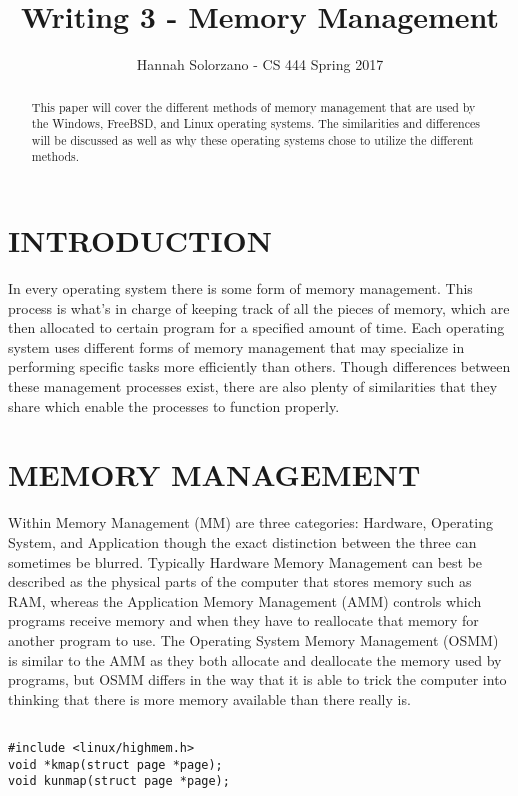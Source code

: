 \documentclass[letterpaper, 10 pt, conference]{ieeeconf}
\title{\LARGE \bf
Writing 3 - Memory Management
}
\author{Hannah Solorzano - CS 444 Spring 2017}
\begin{document}
\maketitle
\thispagestyle{empty}
\pagestyle{empty}

\begin{abstract}

This paper will cover the different methods of memory management that are used by the Windows, FreeBSD, and Linux operating systems. The similarities and differences will be discussed as well as why these operating systems chose to utilize the different methods.

\end{abstract}

\section{INTRODUCTION}

In every operating system there is some form of memory management. This process is what's in charge of keeping track of all the pieces of memory, which are then allocated to certain program for a specified amount of time. Each operating system uses different forms of memory management that may specialize in performing specific tasks more efficiently than others. Though differences between these management processes exist, there are also plenty of similarities that they share which enable the processes to function properly.

\section{MEMORY MANAGEMENT}

Within Memory Management (MM) are three categories: Hardware, Operating System, and Application though the exact distinction between the three can sometimes be blurred. Typically Hardware Memory Management can best be described as the physical parts of the computer that stores memory such as RAM, whereas the Application Memory Management (AMM) controls which programs receive memory and when they have to reallocate that memory for another program to use. The Operating System Memory Management (OSMM) is similar to the AMM as they both allocate and deallocate the memory used by programs, but OSMM differs in the way that it is able to trick the computer into thinking that there is more memory available than there really is.\par

\begin{lstlisting}[caption={ The functions that return the virtual memory address },label={lst:label}]

#include <linux/highmem.h>
void *kmap(struct page *page);
void kunmap(struct page *page);

\end{lstlisting}
\end{document}
